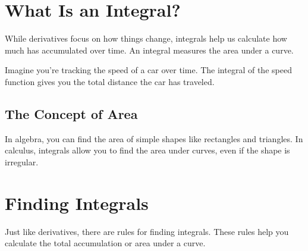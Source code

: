 \begin{enumerate}
    \begin{center}
    \end{center}
\end{enumerate}


\section{What Is an Integral?}
While derivatives focus on how things change, integrals help us calculate how much has accumulated over time. An integral measures the area under a curve.

Imagine you’re tracking the speed of a car over time. The integral of the speed function gives you the total distance the car has traveled.

\subsection{The Concept of Area}
In algebra, you can find the area of simple shapes like rectangles and triangles. In calculus, integrals allow you to find the area under curves, even if the shape is irregular.

\section{Finding Integrals}
Just like derivatives, there are rules for finding integrals. These rules help you calculate the total accumulation or area under a curve.

